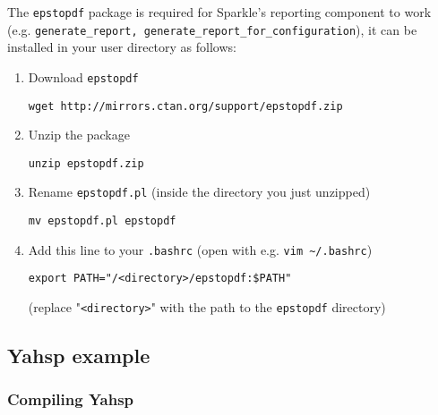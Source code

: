 \documentclass{article}
\begin{document}
The \texttt{epstopdf} package is required for Sparkle's reporting component to work (e.g. \texttt{generate\_report, generate\_report\_for\_configuration}), it can be installed in your user directory as follows:

\begin{enumerate}
  \item Download \texttt{epstopdf}

  \texttt{wget http://mirrors.ctan.org/support/epstopdf.zip}

  \item Unzip the package

  \texttt{unzip epstopdf.zip}

  \item Rename \texttt{epstopdf.pl} (inside the directory you just unzipped)

  \texttt{mv epstopdf.pl epstopdf}

  \item Add this line to your \texttt{.bashrc} (open with e.g. \texttt{vim \~{}/.bashrc})

  \texttt{export PATH="/<directory>/epstopdf:\$PATH"}

  (replace "\texttt{<directory>}" with the path to the \texttt{epstopdf} directory)
\end{enumerate}

\subsection{Yahsp example}

\subsubsection{Compiling Yahsp}

\end{document}
